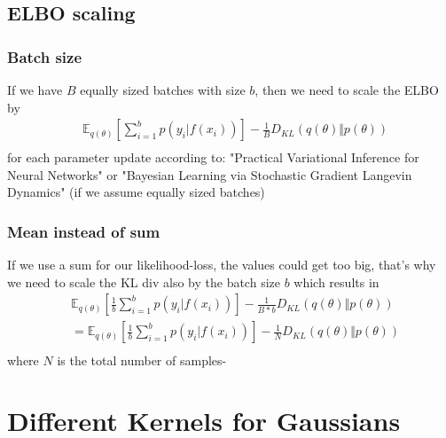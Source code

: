 \documentclass[a4paper]{scrartcl}
\begin{document}
  \subsection{ELBO scaling}
    \subsubsection{Batch size}
      If we have $B$ equally sized batches with size $b$, then we need to scale the ELBO by
      \begin{align*}
        & \mathbb{E}_{q(\theta)}[\sum_{i=1}^b p(y_i \vert f(x_i))] - \frac{1}{B} D_{KL}(q(\theta) \Vert p(\theta))\\
      \end{align*}
      for each parameter update according to: "Practical Variational Inference
      for Neural Networks"
      or "Bayesian Learning via Stochastic Gradient Langevin Dynamics" (if we assume equally sized batches)

    \subsubsection{Mean instead of sum}
      If we use a sum for our likelihood-loss, the values could get too big,
      that's why we need to scale the KL div also by the batch size $b$ which results in
      \begin{align*}
        & \mathbb{E}_{q(\theta)}[\frac{1}{b}\sum_{i=1}^b p(y_i \vert f(x_i))] - \frac{1}{B *b} D_{KL}(q(\theta) \Vert p(\theta))\\
        &= \mathbb{E}_{q(\theta)}[\frac{1}{b}\sum_{i=1}^b p(y_i \vert f(x_i))] - \frac{1}{N} D_{KL}(q(\theta) \Vert p(\theta))\\
      \end{align*}
      where $N$ is the total number of samples-


\section{Different Kernels for Gaussians}
\end{document}
